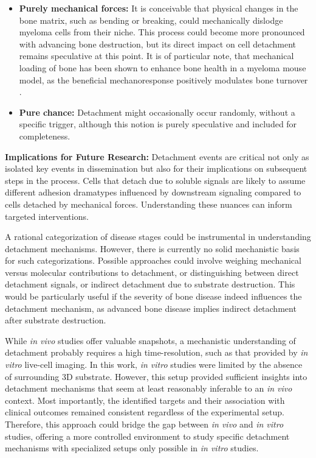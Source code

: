 \begin{itemize}
      \item\textbf{Purely mechanical forces:} It is conceivable that physical
            changes in the bone matrix, such as bending or breaking, could
            mechanically dislodge myeloma cells from their niche. This process
            could become more pronounced with advancing bone destruction, but
            its direct impact on cell detachment remains speculative at this
            point. It is of particular note, that mechanical loading of bone has
            been shown to enhance bone health in a myeloma mouse model, as the
            beneficial mechanoresponse positively modulates bone turnover
            \cite{rummlerMechanicalLoadingPrevents2021}.

      \item\textbf{Pure chance:} Detachment might occasionally occur randomly,
            without a specific trigger, although this notion is purely
            speculative and included for completeness.

\end{itemize}

\textbf{Implications for Future Research:}%
Detachment events are critical not only as isolated key events in dissemination
but also for their implications on subsequent steps in the process. Cells that
detach due to soluble signals are likely to assume different adhesion dramatypes
influenced by downstream signaling compared to cells detached by mechanical
forces. Understanding these nuances can inform targeted interventions.

A rational categorization of disease stages could be instrumental in
understanding detachment mechanisms. However, there is currently no solid
mechanistic basis for such categorizations. Possible approaches could involve
weighing mechanical versus molecular contributions to detachment, or
distinguishing between direct detachment signals, or indirect detachment due to
substrate destruction. This would be particularly useful if the severity of bone
disease indeed influences the detachment mechanism, as advanced bone disease
implies indirect detachment after substrate destruction.

While \textit{in vivo} studies offer valuable snapshots, a mechanistic
understanding of detachment probably requires a high time-resolution, such as
that provided by \textit{in vitro} live-cell imaging. In this work, \textit{in
vitro} studies were limited by the absence of surrounding 3D substrate. However,
this setup provided sufficient insights into detachment mechanisms that seem at
least reasonably inferable to an \textit{in vivo} context. Most importantly, the
identified targets and their association with clinical outcomes remained
consistent regardless of the experimental setup. Therefore, this approach could
bridge the gap between \textit{in vivo} and \textit{in vitro} studies, offering
a more controlled environment to study specific detachment mechanisms with
specialized setups only possible in \textit{in vitro} studies.


